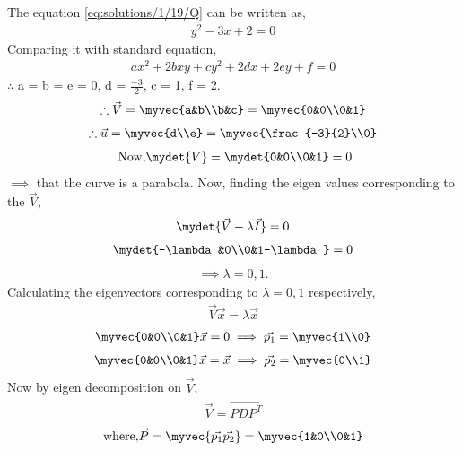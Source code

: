 The equation \eqref{eq:solutions/1/19/Q} can be written as,
\begin{align}
y^2-3x+2 = 0
\end{align}
Comparing it with standard equation,
\begin{align}
ax^2+2bxy+cy^2+2dx+2ey+f = 0
\end{align}
$\therefore$ a = b = e = 0, d = $\frac{-3}{2}$, c = 1, f = 2.
\begin{align}
\therefore \vec{V} = \myvec{a&b\\b&c} = \myvec{0&0\\0&1}
\end{align} 
\begin{align}
\therefore\vec{u} = \myvec{d\\e} = \myvec{\frac{-3}{2}\\0}\label{eq:solutions/1/19/u}
\end{align}
\begin{align}
 \mbox{ Now,} \mydet{V} = \mydet{0&0\\0&1} = 0
\end{align}
$\implies$ that the curve is a parabola. Now, finding the eigen values corresponding to the $\vec{V}$,
\begin{align}
\mydet{\vec{V}-\lambda\vec{I}} = 0
\end{align}
\begin{align}
\mydet{-\lambda&0\\0&1-\lambda} = 0
\end{align}
\begin{align}
\implies \lambda = 0,1.
\end{align}
Calculating the eigenvectors corresponding to $\lambda = 0,1$ respectively,
\begin{align}
\vec{V}\vec{x} = \lambda\vec{x}
\end{align}
\begin{align}
\myvec{0&0\\0&1}\vec{x} = 0 \implies \vec{p_1} = \myvec{1\\0}
\end{align}
\begin{align}
\myvec{0&0\\0&1}\vec{x} = \vec{x} \implies \vec{p_2} = \myvec{0\\1}
\end{align}
Now by eigen decomposition on $\vec{V}$,
\begin{align}
\vec{V} = \vec{PDP^T}
\label{eq:solutions/1/19/V}
\end{align}
\begin{align}
\mbox{where,} \vec{P} = \myvec{\vec{p_1} \vec{p_2}} = \myvec{1&0\\0&1}
\end{align}
